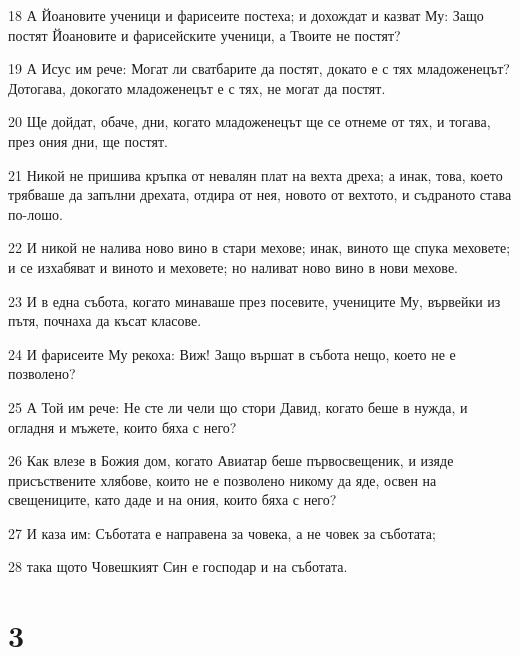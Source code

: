 \par 18 А Йоановите ученици и фарисеите постеха; и дохождат и казват Му: Защо постят Йоановите и фарисейските ученици, а Твоите не постят?
\par 19 А Исус им рече: Могат ли сватбарите да постят, докато е с тях младоженецът? Дотогава, докогато младоженецът е с тях, не могат да постят.
\par 20 Ще дойдат, обаче, дни, когато младоженецът ще се отнеме от тях, и тогава, през ония дни, ще постят.
\par 21 Никой не пришива кръпка от невалян плат на вехта дреха; а инак, това, което трябваше да запълни дрехата, отдира от нея, новото от вехтото, и съдраното става по-лошо.
\par 22 И никой не налива ново вино в стари мехове; инак, виното ще спука меховете; и се изхабяват и виното и меховете; но наливат ново вино в нови мехове.
\par 23 И в една събота, когато минаваше през посевите, учениците Му, вървейки из пътя, почнаха да късат класове.
\par 24 И фарисеите Му рекоха: Виж! Защо вършат в събота нещо, което не е позволено?
\par 25 А Той им рече: Не сте ли чели що стори Давид, когато беше в нужда, и огладня и мъжете, които бяха с него?
\par 26 Как влезе в Божия дом, когато Авиатар беше първосвещеник, и изяде присъствените хлябове, които не е позволено никому да яде, освен на свещениците, като даде и на ония, които бяха с него?
\par 27 И каза им: Съботата е направена за човека, а не човек за съботата;
\par 28 така щото Човешкият Син е господар и на съботата.

\chapter{3}

